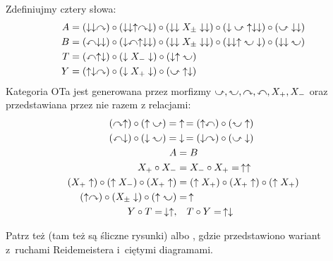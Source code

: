\begin{proposition}
    Zdefiniujmy cztery słowa:
    \begin{align}
        A & = (\downarrow \downarrow \curvearrowright) \circ (\downarrow \downarrow \uparrow \curvearrowright \downarrow) \circ (\downarrow \downarrow X_\pm \downarrow \downarrow) \circ (\downarrow \inversedcurvearrowright \uparrow \downarrow \downarrow) \circ (\inversedcurvearrowright \downarrow \downarrow) \\
        B & = (\curvearrowleft \downarrow \downarrow) \circ (\downarrow \curvearrowleft \uparrow \downarrow \downarrow) \circ (\downarrow \downarrow X_\pm \downarrow \downarrow) \circ (\downarrow \downarrow \uparrow \inversedcurvearrowleft \downarrow) \circ (\downarrow \downarrow \inversedcurvearrowleft) \\
        T & = (\curvearrowleft \uparrow \downarrow) \circ (\downarrow X_- \downarrow) \circ (\downarrow \uparrow \inversedcurvearrowleft) \\
        Y & = (\uparrow \downarrow \curvearrowright) \circ (\downarrow X_+ \downarrow) \circ (\inversedcurvearrowright \uparrow \downarrow)
    \end{align}
    Kategoria OTa jest generowana przez morfizmy $\inversedcurvearrowright, \inversedcurvearrowleft, \curvearrowright, \curvearrowleft, X_+, X_-$ oraz przedstawiana przez nie razem z relacjami:
    \begin{align}
        (\curvearrowright \uparrow) \circ (\uparrow \inversedcurvearrowright) = & \uparrow \, = (\uparrow \curvearrowleft) \circ (\inversedcurvearrowleft \uparrow) \\
        (\curvearrowleft \downarrow) \circ (\downarrow \inversedcurvearrowleft) = & \downarrow \, = (\downarrow \curvearrowright) \circ (\inversedcurvearrowright \downarrow) \\
        A & = B \\
        X_+ \circ X_- & = X_- \circ X_+ = \, \uparrow \uparrow \\
        (X_+ \uparrow) \circ (\uparrow X_-) \circ (X_+ \uparrow) & = (\uparrow X_+) \circ (X_+ \uparrow) \circ (\uparrow X_+) \\
        (\uparrow \curvearrowright) \circ (X_\pm \downarrow) \circ (\uparrow \inversedcurvearrowleft) & = \, \uparrow \\
        Y \circ T = \, \downarrow \uparrow, & \quad T \circ Y = \, \uparrow \downarrow
    \end{align}
\end{proposition}

Patrz też \cite[s. 29-30]{duzhin12} (tam też są śliczne rysunki) albo \cite[s. 31]{schieber18}, gdzie przedstawiono wariant z~ruchami Reidemeistera i~ciętymi diagramami.

